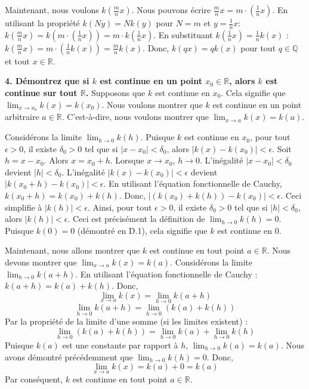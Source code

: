 \documentclass[12pt,a4paper]{report}
\begin{document}
Maintenant, nous voulons $k\left(\frac{m}{n}x\right)$.
Nous pouvons écrire $\frac{m}{n}x = m \cdot \left(\frac{1}{n}x\right)$.
En utilisant la propriété $k(Ny) = Nk(y)$ pour $N=m$ et $y=\frac{1}{n}x$:
$k\left(\frac{m}{n}x\right) = k\left(m \cdot \left(\frac{1}{n}x\right)\right) = m \cdot k\left(\frac{1}{n}x\right)$.
En substituant $k\left(\frac{1}{n}x\right) = \frac{1}{n}k(x)$ :
$k\left(\frac{m}{n}x\right) = m \cdot \left(\frac{1}{n}k(x)\right) = \frac{m}{n}k(x)$.
Donc, $k(qx) = qk(x)$ pour tout $q \in \mathbb{Q}$ et tout $x \in \mathbb{R}$.

\textbf{4. Démontrez que si $k$ est continue en un point $x_0 \in \mathbb{R}$, alors $k$ est continue sur tout $\mathbb{R}$.}
Supposons que $k$ est continue en $x_0$. Cela signifie que $\lim_{x \to x_0} k(x) = k(x_0)$.
Nous voulons montrer que $k$ est continue en un point arbitraire $a \in \mathbb{R}$.
C'est-à-dire, nous voulons montrer que $\lim_{x \to a} k(x) = k(a)$.

Considérons la limite $\lim_{h \to 0} k(h)$.
Puisque $k$ est continue en $x_0$, pour tout $\epsilon > 0$, il existe $\delta_0 > 0$ tel que si $|x - x_0| < \delta_0$, alors $|k(x) - k(x_0)| < \epsilon$.
Soit $h = x - x_0$. Alors $x = x_0 + h$. Lorsque $x \to x_0$, $h \to 0$.
L'inégalité $|x - x_0| < \delta_0$ devient $|h| < \delta_0$.
L'inégalité $|k(x) - k(x_0)| < \epsilon$ devient $|k(x_0+h) - k(x_0)| < \epsilon$.
En utilisant l'équation fonctionnelle de Cauchy, $k(x_0+h) = k(x_0) + k(h)$.
Donc, $|(k(x_0) + k(h)) - k(x_0)| < \epsilon$.
Ceci simplifie à $|k(h)| < \epsilon$.
Ainsi, pour tout $\epsilon > 0$, il existe $\delta_0 > 0$ tel que si $|h| < \delta_0$, alors $|k(h)| < \epsilon$.
Ceci est précisément la définition de $\lim_{h \to 0} k(h) = 0$.
Puisque $k(0)=0$ (démontré en D.1), cela signifie que $k$ est continue en $0$.

Maintenant, nous allons montrer que $k$ est continue en tout point $a \in \mathbb{R}$.
Nous devons montrer que $\lim_{x \to a} k(x) = k(a)$.
Considérons la limite $\lim_{h \to 0} k(a+h)$.
En utilisant l'équation fonctionnelle de Cauchy :
$k(a+h) = k(a) + k(h)$.
Donc,
$$
\lim_{x \to a} k(x) = \lim_{h \to 0} k(a+h)
$$
$$
\lim_{h \to 0} k(a+h) = \lim_{h \to 0} (k(a) + k(h))
$$
Par la propriété de la limite d'une somme (si les limites existent) :
$$
\lim_{h \to 0} (k(a) + k(h)) = \lim_{h \to 0} k(a) + \lim_{h \to 0} k(h)
$$
Puisque $k(a)$ est une constante par rapport à $h$, $\lim_{h \to 0} k(a) = k(a)$.
Nous avons démontré précédemment que $\lim_{h \to 0} k(h) = 0$.
Donc,
$$
\lim_{x \to a} k(x) = k(a) + 0 = k(a)
$$
Par conséquent, $k$ est continue en tout point $a \in \mathbb{R}$.
\end{document}
